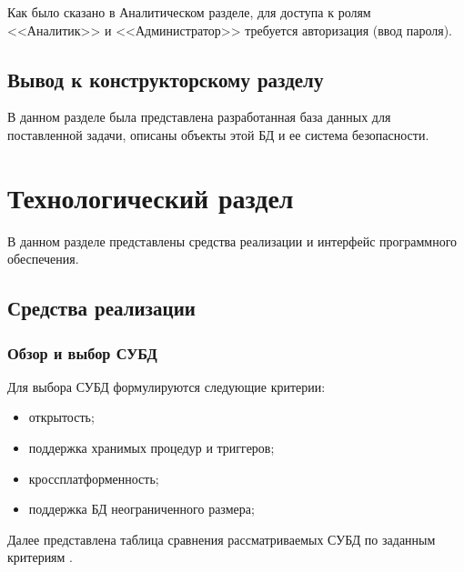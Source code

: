 \documentclass{bmstu}
\begin{document}
Как было сказано в Аналитическом разделе, для доступа к ролям <<Аналитик>> и <<Администратор>> требуется авторизация (ввод пароля).

\section*{Вывод к конструкторскому разделу}

В данном разделе была представлена разработанная база данных для поставленной задачи, описаны объекты этой БД и ее система безопасности.

\chapter{Технологический раздел}

В данном разделе представлены средства реализации и интерфейс программного обеспечения.

\section{Средства реализации}

\subsection*{Обзор и выбор СУБД}

Для выбора СУБД формулируются следующие критерии:

\begin{itemize}
	\item открытость;
	\item поддержка хранимых процедур и триггеров;
	\item кроссплатформенность;
	\item поддержка БД неограниченного размера;
\end{itemize}

Далее представлена таблица сравнения рассматриваемых СУБД по заданным критериям \cite{orc_db, mssql, pg, db2}.
\end{document}
